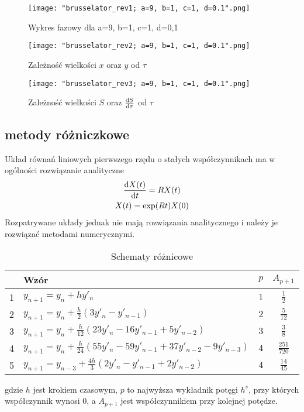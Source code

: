 \documentclass[10pt, a4paper, twoside, onecolumn]{article}
\numberwithin{equation}{section}
\begin{document}
	\begin{figure}[H]
		\centering
		\texttt{[image: "brusselator\_rev1; a=9, b=1, c=1, d=0.1".png]}
		\caption{Wykres fazowy dla a=9, b=1, c=1, d=0,1}
	\end{figure}
	\begin{figure}[H]
		\centering
		\texttt{[image: "brusselator\_rev2; a=9, b=1, c=1, d=0.1".png]}
		\caption{Zależność wielkości \(x\) oraz \(y\) od \(\tau\)}
	\end{figure}
	\begin{figure}[H]
		\centering
		\texttt{[image: "brusselator\_rev3; a=9, b=1, c=1, d=0.1".png]}
		\caption{Zależność wielkości \(S\) oraz \(\dv{S}{\tau}\) od \(\tau\)}
	\end{figure}
	
	\subsection{metody różniczkowe}
	Układ równań liniowych pierwszego rzędu o stałych współczynnikach ma w ogólności rozwiązanie analityczne \cite{palczewski}
	\begin{gather}
		\dv{X(t)}{t}=RX(t) \\
		X(t)=\exp(Rt)X(0)
	\end{gather}
	Rozpatrywane układy jednak nie mają rozwiązania analitycznego i należy je rozwiązać metodami numerycznymi. \par
	\begin{table}[H]\label{tab:schematy}
		\centering
		\begin{tabular}{|l|l|c|c|}
			\hline
			 & Wzór & \(p\) & \(A_{p+1}\) \\
			\hline
			1 & \(y_{n+1}=y_{n}+hy'_{n}\) & \(1\) & \(\frac{1}{2}\) \\
			\hline
			2 & \(y_{n+1}=y_{n}+\frac{h}{2}(3y'_{n}-y'_{n-1})\) & \(2\) & \(\frac{5}{12}\) \\
			\hline
			3 & \(y_{n+1}=y_{n}+\frac{h}{12}(23y'_{n}-16y'_{n-1}+5y'_{n-2})\) & \(3\) & \(\frac{3}{8}\) \\
			\hline
			4 & \(y_{n+1}=y_{n}+\frac{h}{24}(55y'_{n}-59y'_{n-1}+37y'_{n-2}-9y'_{n-3})\) & \(4\) & \(\frac{251}{720}\) \\
			\hline
			5 & \(y_{n+1}=y_{n-3}+\frac{4h}{3}(2y'_{n}-y'_{n-1}+2y'_{n-2})\) & \(4\) & \(\frac{14}{45}\) \\
			\hline
		\end{tabular}
		\caption{Schematy różnicowe}
	\end{table}
	gdzie \(h\) jest krokiem czasowym, \(p\) to najwyższa wykładnik potęgi \(h^{s}\), przy których współczynnik wynosi \(0\), a \(A_{p+1}\) jest współczynnikiem przy kolejnej potędze.
\end{document}

